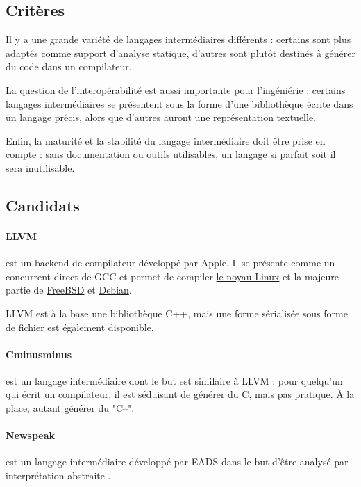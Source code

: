 \documentclass{phdthesis}
\begin{document}
\subsection{Critères}

Il y a une grande variété de langages intermédiaires différents : certains sont
plus adaptés comme support d'analyse statique, d'autres sont plutôt destinés à
générer du code dans un compilateur.

La question de l'interopérabilité est aussi importante pour l'ingéniérie :
certains langages intermédiaires se présentent sous la forme d'une bibliothèque
écrite dans un langage précis, alors que d'autres auront une représentation
textuelle.

Enfin, la maturité et la stabilité du langage intermédiaire doit être prise en
compte : sans documentation ou outils utilisables, un langage si parfait soit il
sera inutilisable.

\subsection{Candidats}

\paragraph{LLVM}\cite{llvm-pres} est un backend de compilateur développé par
Apple. Il se présente comme un concurrent direct de GCC et permet de compiler
\href{http://lwn.net/Articles/411654/}{le noyau Linux} et la majeure partie de
\href{http://lists.freebsd.org/pipermail/freebsd-current/2009-February/003743.html}{FreeBSD}
et \href{http://lwn.net/Articles/485301/}{Debian}.

LLVM est à la base une bibliothèque C++, mais une forme sérialisée sous forme
de fichier est également disponible.

\paragraph{Cminusminus}\cite{spjcmm} est un langage intermédiaire dont le but
est similaire à LLVM : pour quelqu'un qui écrit un compilateur, il est séduisant
de générer du C, mais pas pratique. À la place, autant générer du "C--".

\paragraph{Newspeak}\cite{npkSem} est un langage intermédiaire développé par
EADS dans le but d'être analysé par interprétation abstraite .
\end{document}
